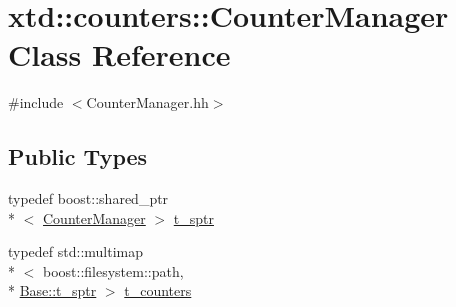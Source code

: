 \hypertarget{classxtd_1_1counters_1_1CounterManager}{\section{xtd\-:\-:counters\-:\-:Counter\-Manager Class Reference}
\label{classxtd_1_1counters_1_1CounterManager}
}


{\ttfamily \#include $<$Counter\-Manager.\-hh$>$}

\subsection*{Public Types}
\begin{DoxyCompactItemize}
\item 
typedef boost\-::shared\-\_\-ptr\\*
$<$ \hyperlink{classxtd_1_1counters_1_1CounterManager}{Counter\-Manager} $>$ \hyperlink{classxtd_1_1counters_1_1CounterManager_ac136b7de8a55b55a2700d93901ba1e9a}{t\-\_\-sptr}
\item 
typedef std\-::multimap\\*
$<$ boost\-::filesystem\-::path, \\*
\hyperlink{classxtd_1_1counters_1_1Base_aa0ea634f1a5e3df87418566a3e8fcbd6}{Base\-::t\-\_\-sptr} $>$ \hyperlink{classxtd_1_1counters_1_1CounterManager_ae675635fccfde42cc3831d07adacd2cb}{t\-\_\-counters}
\end{DoxyCompactItemize}
